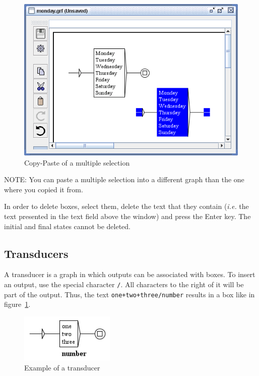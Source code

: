 \bigskip
\begin{figure}[!h]
\begin{center}
\includegraphics[width=13cm]{resources/img/fig5-14.png}
\caption{Copy-Paste of a multiple selection}
\end{center}
\end{figure}

\noindent NOTE: You can paste a multiple selection into a different graph than
the one where you copied it from.

\bigskip
{}
\noindent In order to delete boxes, select them, delete the text that they
contain (\textit{i.e.} the text presented in the text field above the window)
and press the Enter key. The initial and final states cannot be deleted.

\subsection{Transducers}
\index{\verb+/+}
A transducer is a graph in which outputs can be associated with boxes. To insert
an output, use the special character \verb+/+. All characters to the right of
it will be part of the output. Thus, the text \verb$one+two+three/number$ results in
a box like in figure~\ref{fig-exemple-transduction}.

\bigskip
\begin{figure}[h]
\begin{center}
\includegraphics[width=4.5cm]{resources/img/fig5-15.png}
\caption{Example of a transducer\label{fig-exemple-transduction}}
\end{center}
\end{figure}

